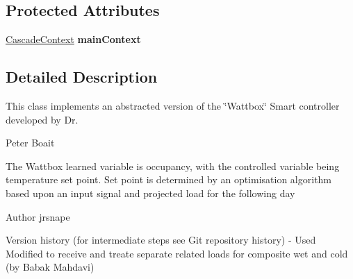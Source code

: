 \subsection*{Protected Attributes}
\begin{DoxyCompactItemize}
\item 
\hypertarget{classuk_1_1ac_1_1dmu_1_1iesd_1_1cascade_1_1controllers_1_1_original_proportional_wattbox_controller_a2756f9d4df8586549ea43942add8edff}{\hyperlink{classuk_1_1ac_1_1dmu_1_1iesd_1_1cascade_1_1context_1_1_cascade_context}{Cascade\-Context} {\bfseries main\-Context}}\label{classuk_1_1ac_1_1dmu_1_1iesd_1_1cascade_1_1controllers_1_1_original_proportional_wattbox_controller_a2756f9d4df8586549ea43942add8edff}

\end{DoxyCompactItemize}


\subsection{Detailed Description}
This class implements an abstracted version of the \char`\"{}\-Wattbox\char`\"{} Smart controller developed by Dr. 

Peter Boait

The Wattbox learned variable is occupancy, with the controlled variable being temperature set point. Set point is determined by an optimisation algorithm based upon an input signal and projected load for the following day

\begin{DoxyAuthor}{Author}
jrsnape \begin{DoxyVerb}    Version history (for intermediate steps see Git repository history) -
    Used Modified to receive and treate separate related loads for
    composite wet and cold (by Babak Mahdavi)\end{DoxyVerb}
 
\end{DoxyAuthor}


